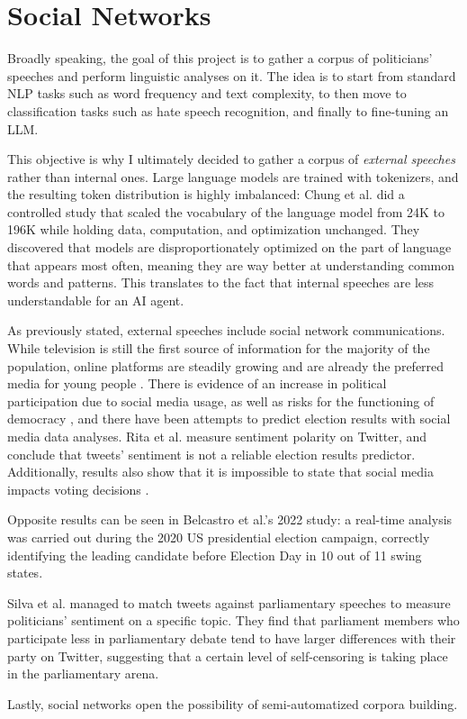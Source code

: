 \section{Social Networks}

Broadly speaking, the goal of this project is to gather a corpus of politicians' speeches and perform linguistic analyses on it. The idea is to start from standard NLP tasks such as word frequency and text complexity, to then move to classification tasks such as hate speech recognition, and finally to fine-tuning an LLM.

This objective is why I ultimately decided to gather a corpus of \textit{external speeches} rather than internal ones. Large language models are trained with tokenizers, and the resulting token distribution is highly imbalanced: Chung et al. \cite{chung_exploiting_2025} did a controlled study that scaled the vocabulary of the language model from 24K to 196K while holding data, computation, and optimization unchanged. They discovered that models are disproportionately optimized on the part of language that appears most often, meaning they are way better at understanding common words and patterns. This translates to the fact that internal speeches are less understandable for an AI agent. 

As previously stated, external speeches include social network communications. While television is still the first source of information for the majority of the population, online platforms are steadily growing and are already the preferred media for young people \cite{eurobarometer_media_2023,maher_twice_2024}. There is evidence of an increase in political participation due to social media usage, as well as risks for the functioning of democracy \cite{lorenz-spreen_systematic_2023,amsalem_people_2023}, and there have been attempts to predict election results with social media data analyses. Rita et al. measure sentiment polarity on Twitter, and conclude that tweets' sentiment is not a reliable election results predictor. Additionally, results also show that it is impossible to state that social media impacts voting decisions \cite{rita_social_2023}. 

Opposite results can be seen in Belcastro et al.'s \cite{belcastro_analyzing_2022} 2022 study: a real-time analysis was carried out during the 2020 US presidential election campaign, correctly identifying the leading candidate before Election Day in 10 out of 11 swing states.

Silva et al. \cite{silva_politicians_2022} managed to match tweets against parliamentary speeches to measure politicians' sentiment on a specific topic. They find that parliament members who participate less in parliamentary debate tend to have larger differences with their party on Twitter, suggesting that a certain level of self-censoring is taking place in the parliamentary arena.

Lastly, social networks open the possibility of semi-automatized corpora building.
